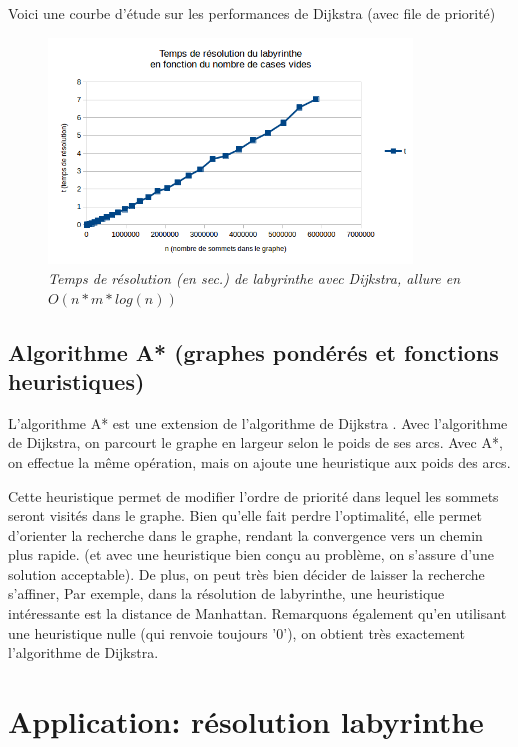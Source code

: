 \documentclass[10pt]{article}
\begin{document}
				Voici une courbe d'étude sur les performances de Dijkstra (avec file de priorité)
				\begin{figure}[H]
					\begin{center}
						\includegraphics[height=6cm,keepaspectratio]{./images/courbe_temps.png}
					\end{center}
					\caption{\textit{Temps de résolution (en sec.) de labyrinthe avec Dijkstra, allure en \(O(n * m * log(n))\)}}
					\label{courbe_temps}
				\end{figure}

		\subsection{Algorithme A* (graphes pondérés et fonctions heuristiques)}
			L'algorithme A* est une extension de l'algorithme de Dijkstra \cite{computerphile_maze} \cite{computerphile_astar}.
			Avec l'algorithme de Dijkstra, on parcourt le graphe en largeur selon le poids de ses arcs.
			Avec A*, on effectue la même opération, mais on ajoute une heuristique \cite{heuristique} aux poids des arcs.\newline
			
			Cette heuristique permet de modifier l'ordre de priorité dans lequel les sommets seront visités dans le graphe.
			Bien qu'elle fait perdre l'optimalité, elle permet d'orienter la recherche dans le graphe, rendant la convergence vers
			un chemin plus rapide. (et avec une heuristique bien conçu au problème, on s'assure d'une solution acceptable).
			De plus, on peut très bien décider de laisser la recherche s'affiner, 
			Par exemple, dans la résolution de labyrinthe, une heuristique intéressante est la distance de Manhattan. \cite{manhattan}			
			Remarquons également qu'en utilisant une heuristique nulle (qui renvoie toujours '0'),
			on obtient très exactement l'algorithme de Dijkstra.

	\section{Application: résolution labyrinthe}
	
\end{document}
